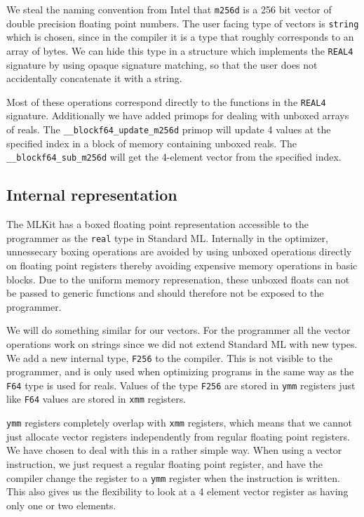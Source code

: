 \documentclass{article}
\begin{document}
We steal the naming convention from Intel that \texttt{m256d} is a 256 bit vector of double precision floating point numbers. The user facing type of vectors is \verb!string! which is chosen, since in the compiler it is a type that roughly corresponds to an array of bytes. We can hide this type in a structure which implements the \texttt{REAL4} signature by using opaque signature matching, so that the user does not accidentally concatenate it with a string.

Most of these operations correspond directly to the functions in the \texttt{REAL4} signature. Additionally we have added primops for dealing with unboxed arrays of reals. The \verb!__blockf64_update_m256d! primop will update 4 values at the specified index in a block of memory containing unboxed reals. The \verb!__blockf64_sub_m256d! will get the 4-element vector from the specified index.
    
\subsection{Internal representation}

The MLKit has a boxed floating point representation accessible to the programmer as the \verb!real! type in Standard ML. Internally in the optimizer, unnessecary boxing operations are avoided by using unboxed operations directly on floating point registers thereby avoiding expensive memory operations in basic blocks. Due to the uniform memory represenation, these unboxed floats can not be passed to generic functions and should therefore not be exposed to the programmer.

We will do something similar for our vectors. For the programmer all the vector operations work on strings since we did not extend Standard ML with new types. We add a new internal type, \texttt{F256} to the compiler. This is not visible to the programmer, and is only used when optimizing programs in the same way as the \texttt{F64} type is used for reals. Values of the type \texttt{F256} are stored in \texttt{ymm} registers just like \texttt{F64} values are stored in \texttt{xmm} registers.

\texttt{ymm} registers completely overlap with \texttt{xmm} registers, which means that we cannot just allocate vector registers independently from regular floating point registers. We have chosen to deal with this in a rather simple way. When using a vector instruction, we just request a regular floating point register, and have the compiler change the register to a \texttt{ymm} register when the instruction is written. This also gives us the flexibility to look at a 4 element vector register as having only one or two elements.
\end{document}
